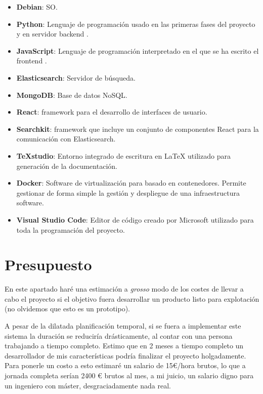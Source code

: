 \begin{itemize}
	\item \textbf{Debian}: \acrfull{SO}.
	\item \textbf{Python}: Lenguaje de programación usado en las primeras fases del proyecto y en servidor \gls{backend} .
	\item \textbf{JavaScript}: Lenguaje de programación interpretado en el que se ha escrito el \gls{frontend} .
	\item \textbf{Elasticsearch}: Servidor de búsqueda.
	\item \textbf{MongoDB}: Base de datos NoSQL.
	\item \textbf{React}:  \Gls{framework} para el desarrollo de interfaces de usuario.
	\item \textbf{Searchkit}: \Gls{framework} que incluye un conjunto de componentes React para la comunicación con Elasticsearch.
	\item \textbf{TeXstudio}: Entorno integrado de escritura en \LaTeX{} utilizado para generación de la documentación.
	\item \textbf{Docker}: Software de virtualización para basado en contenedores. Permite gestionar de forma simple la gestión y despliegue de una infraestructura software.
	\item \textbf{Visual Studio Code}: Editor de código creado por Microsoft utilizado para toda la programación del proyecto.
	
\end{itemize}

\section{Presupuesto}

En este apartado haré una estimación a \textit{grosso} modo de los costes de llevar a cabo el proyecto si el objetivo fuera desarrollar un producto listo para explotación (no olvidemos que esto es un prototipo). 

A pesar de la dilatada planificación temporal, si se fuera a implementar este sistema la duración se reduciría drásticamente, al contar con una persona trabajando a tiempo completo. Estimo que en 2 meses a tiempo completo un desarrollador de mis características podría finalizar el proyecto holgadamente. Para ponerle un costo a esto estimaré un salario de 15€/hora brutos, lo que a jornada completa serían 2400 € brutos al mes, a mi juicio, un salario digno para un ingeniero con máster, desgraciadamente nada real. 

